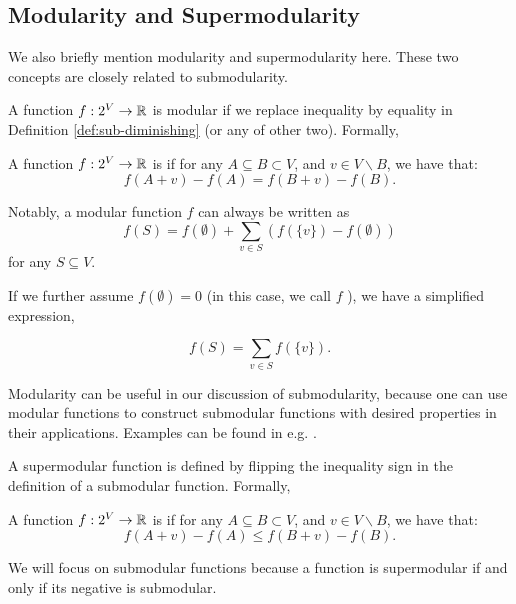 \subsection{Modularity and Supermodularity}
We also briefly mention modularity and supermodularity here. These two concepts are closely related to submodularity. 

A function $f: 2^V \rightarrow \mathbb{R}$ is modular if we replace inequality by equality in Definition \ref{def:sub-diminishing} (or any of other two). Formally, 

\begin{definition}[Modularity]
  \label{def:modular}
  A function $f: 2^V \rightarrow \mathbb{R}$ is  if for any $A \subseteq B \subset V$, and $v \in V\backslash B$, we have that:
  \begin{equation}
    \label{eq:modular}
    f(A + v) - f(A) = f(B + v) - f(B).
  \end{equation}
\end{definition}
Notably, a modular function $f$ can always be written as
$$f(S) = f(\emptyset) + \sum_{v\in S} \left( f(\{v\}) - f(\emptyset) \right)$$
for any $S \subseteq V$.

If we further assume $f(\emptyset) = 0$ (in this case, we call $f$ ), we have a simplified expression,

$$f(S) = \sum_{v\in S} f(\{v\}).$$


Modularity can be useful in our discussion of submodularity, because one can use modular functions to construct submodular functions with desired properties in their applications. Examples can be found in e.g. \cite{LB11,LB11word}.




A supermodular function is defined by flipping the inequality sign in the definition of a submodular function. Formally,
\begin{definition}[Supermodularity]
  \label{def:supermodular}
  A function $f: 2^V \rightarrow \mathbb{R}$ is  if for any $A \subseteq B \subset V$, and $v \in V\backslash B$, we have that:
  \begin{equation}
    \label{eq:submodular}
    f(A + v) - f(A) \leq f(B + v) - f(B).
  \end{equation}
\end{definition}

We will focus on submodular functions because a function is supermodular if and only if its negative is submodular. 



